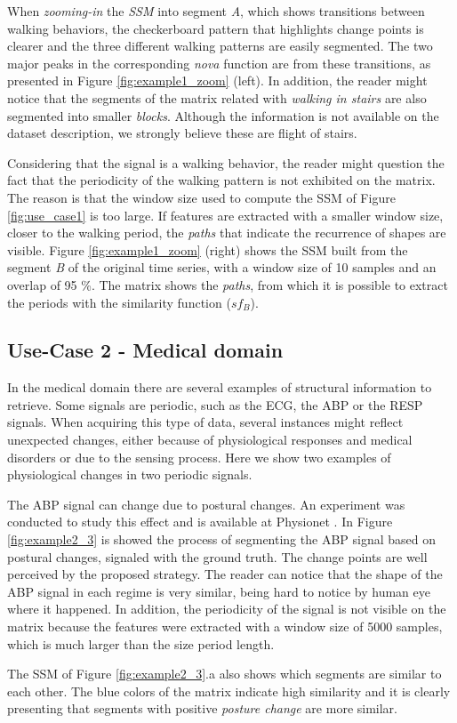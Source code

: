 {When \textit{zooming-in} the \textit{SSM} into segment \textit{A}, which shows transitions between walking behaviors, the checkerboard pattern that highlights change points is clearer and the three different walking patterns are easily segmented. The two major peaks in the corresponding \textit{nova} function are from these transitions, as presented in Figure \ref{fig:example1_zoom} (left). In addition, the reader might notice that the segments of the matrix related with \textit{walking in stairs} are also segmented into smaller \textit{blocks}. Although the information is not available on the dataset description, we strongly believe these are flight of stairs.
\par
Considering that the signal is a walking behavior, the reader might question the fact that the periodicity of the walking pattern is not exhibited on the matrix. The reason is that the window size used to compute the \gls{SSM} of Figure \ref{fig:use_case1} is too large. If features are extracted with a smaller window size, closer to the walking period, the \textit{paths} that indicate the recurrence of shapes are visible. Figure \ref{fig:example1_zoom} (right) shows the \gls{SSM} built from the segment \textit{B} of the original time series, with a window size of 10 samples and an overlap of 95 \%. The matrix shows the \textit{paths}, from which it is possible to extract the periods with the similarity function ($sf_B$).


\subsection{Use-Case 2 - Medical domain}

In the medical domain there are several examples of structural information to retrieve. Some signals are periodic, such as the \gls{ECG}, the \gls{ABP} or the \gls{RESP} signals. When acquiring this type of data, several instances might reflect unexpected changes, either because of physiological responses and medical disorders or due to the sensing process. Here we show two examples of physiological changes in two periodic signals.
\par
The \gls{ABP} signal can change due to postural changes. An experiment was conducted to study this effect and is available at Physionet \cite{tilt, PhysioNet}. In Figure \ref{fig:example2_3} is showed the process of segmenting the \gls{ABP} signal based on postural changes, signaled with the ground truth. The change points are well perceived by the proposed strategy. The reader can notice that the shape of the \gls{ABP} signal in each regime is very similar, being  hard to notice by human eye where it happened. In addition, the periodicity of the signal is not visible on the matrix because the features were extracted with a window size of 5000 samples, which is much larger than the size period length.
\par
The \gls{SSM} of Figure \ref{fig:example2_3}.a also shows which segments are similar to each other. The blue colors of the matrix indicate high similarity and it is clearly presenting that segments with positive \textit{posture change} are more similar.

}
